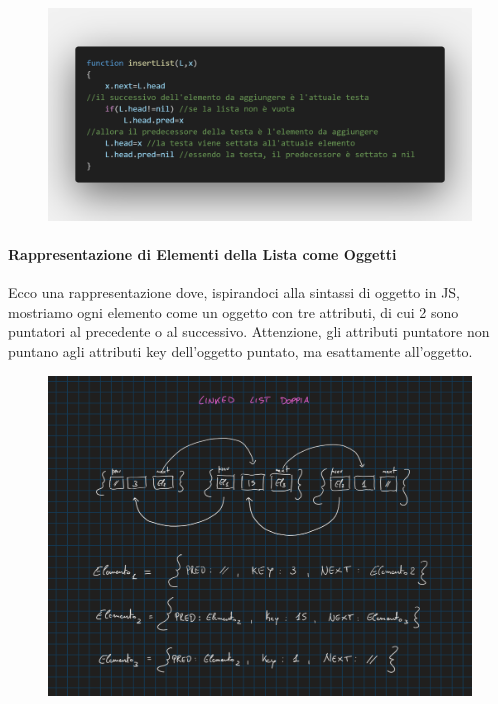 \documentclass{article}
\begin{document}
\begin{figure}[htbp]
    \center
    \includegraphics[scale=0.28]{img/queueOperazioni1.png}
\end{figure}

\paragraph{Rappresentazione di Elementi della Lista come Oggetti} Ecco una rappresentazione dove, ispirandoci alla sintassi di oggetto in JS, mostriamo ogni elemento come un oggetto con tre attributi, di cui 2 sono puntatori al precedente o al successivo. Attenzione, gli attributi puntatore non puntano agli attributi key dell'oggetto puntato, ma esattamente all'oggetto.

\begin{figure}[htbp]
    \center
    \includegraphics[scale=0.35]{img/imgLinkedList.png}
\end{figure}
\end{document}
